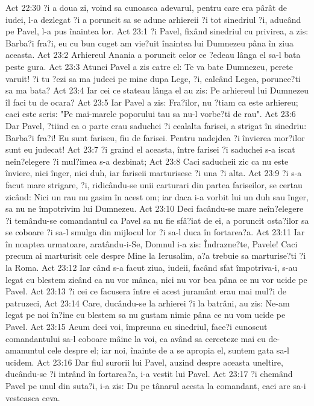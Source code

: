 Act 22:30  ?i a doua zi, voind sa cunoasca adevarul, pentru care era pârât de iudei, l-a dezlegat ?i a poruncit sa se adune arhiereii ?i tot sinedriul ?i, aducând pe Pavel, l-a pus înaintea lor.
Act 23:1  ?i Pavel, fixând sinedriul cu privirea, a zis: Barba?i fra?i, eu cu bun cuget am vie?uit înaintea lui Dumnezeu pâna în ziua aceasta.
Act 23:2  Arhiereul Anania a poruncit celor ce ?edeau lânga el sa-l bata peste gura.
Act 23:3  Atunci Pavel a zis catre el: Te va bate Dumnezeu, perete varuit! ?i tu ?ezi sa ma judeci pe mine dupa Lege, ?i, calcând Legea, porunce?ti sa ma bata?
Act 23:4  Iar cei ce stateau lânga el au zis: Pe arhiereul lui Dumnezeu îl faci tu de ocara?
Act 23:5  Iar Pavel a zis: Fra?ilor, nu ?tiam ca este arhiereu; caci este scris: "Pe mai-marele poporului tau sa nu-l vorbe?ti de rau".
Act 23:6  Dar Pavel, ?tiind ca o parte erau saduchei ?i cealalta farisei, a strigat în sinedriu: Barba?i fra?i! Eu sunt fariseu, fiu de farisei. Pentru nadejdea ?i învierea mor?ilor sunt eu judecat!
Act 23:7  ?i graind el aceasta, între farisei ?i saduchei s-a iscat neîn?elegere ?i mul?imea s-a dezbinat;
Act 23:8  Caci saducheii zic ca nu este înviere, nici înger, nici duh, iar fariseii marturisesc ?i una ?i alta.
Act 23:9  ?i s-a facut mare strigare, ?i, ridicându-se unii carturari din partea fariseilor, se certau zicând: Nici un rau nu gasim în acest om; iar daca i-a vorbit lui un duh sau înger, sa nu ne împotrivim lui Dumnezeu.
Act 23:10  Deci facându-se mare neîn?elegere ?i temându-se comandantul ca Pavel sa nu fie sfâ?iat de ei, a poruncit osta?ilor sa se coboare ?i sa-l smulga din mijlocul lor ?i sa-l duca în fortarea?a.
Act 23:11  Iar în noaptea urmatoare, aratându-i-Se, Domnul i-a zis: Îndrazne?te, Pavele! Caci precum ai marturisit cele despre Mine la Ierusalim, a?a trebuie sa marturise?ti ?i la Roma.
Act 23:12  Iar când s-a facut ziua, iudeii, facând sfat împotriva-i, s-au legat cu blestem zicând ca nu vor mânca, nici nu vor bea pâna ce nu vor ucide pe Pavel.
Act 23:13  ?i cei ce facusera între ei acest juramânt erau mai mul?i de patruzeci,
Act 23:14  Care, ducându-se la arhierei ?i la batrâni, au zis: Ne-am legat pe noi în?ine cu blestem sa nu gustam nimic pâna ce nu vom ucide pe Pavel.
Act 23:15  Acum deci voi, împreuna cu sinedriul, face?i cunoscut comandantului sa-l coboare mâine la voi, ca având sa cerceteze mai cu de-amanuntul cele despre el; iar noi, înainte de a se apropia el, suntem gata sa-l ucidem.
Act 23:16  Dar fiul surorii lui Pavel, auzind despre aceasta uneltire, ducându-se ?i intrând în fortarea?a, i-a vestit lui Pavel.
Act 23:17  ?i chemând Pavel pe unul din suta?i, i-a zis: Du pe tânarul acesta la comandant, caci are sa-i vesteasca ceva.
